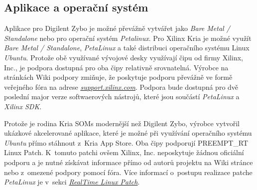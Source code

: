 \documentclass[a4paper, twoside, 11pt]{article}
\begin{document}
			\subsection{Aplikace a operační systém}
				Aplikace pro Digilent Zybo je možné převážně vytvářet jako \textit{Bare Metal / Standalone} nebo pro operační systém \textit{Petalinux}. Pro Xilinx Kria je možné využít \textit{Bare Metal / Standalone}, \textit{PetaLinux} a také distribuci operačního systému Linux \textit{Ubuntu}. Protože obě využívané vývojové desky využívají čipu od firmy Xilinx, Inc., je podpora dostupná pro oba čipy relativně srovnatelná. Výrobce na stránkách Wiki podpory zmiňuje, že poskytuje podporu převážně ve formě veřejného fóra na adrese \href{https://support.xilinx.com}{\textit{support.xilinx.com}}. Podpora bude dostupná pro dvě poslední major verze softwaerových nástrojů, které jsou součástí \textit{PetaLinux} a \textit{Xilinx SDK}. \cite{xilinx-wiki-atlassian-embedded-sw-support}\par
				Protože je rodina Kria SOMs modernější než Digilent Zybo, výrobce vytvořil ukázkové akcelerované aplikace, které je možné při využívání operačního systému \textit{Ubuntu} přímo stáhnout z~Kria App Store. \cite{xilinx-appstore-for-kria-soms}
				Oba čipy podporují PREEMPT\_RT Linux Patch. K~tomuto patchi ovšem Xilinx, Inc. neposkytuje žádnou oficiální podporu a je nutné získávat informace přímo od autorů projektu na Wiki stránce \cite{wiki-linux-foundation-real-time-linux} nebo z~omezené podpory pomocí fóra. Více informací o~postupu realizace patche \textit{PetaLinux} je v~sekci \hyperref[subsec:real-time-linux-patch]{\textit{RealTime Linux Patch}}.
\end{document}
